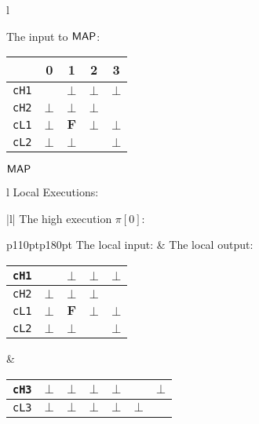 \documentclass[10pt,a4paper,oneside]{article}
\def\VFALSE{\ensuremath{\textbf{F}}}
\def\NIL{\ensuremath{\bot}}
\def\sanserif#1{\ensuremath{\sf #1}}
\def\MAP{\ensuremath{\sanserif{MAP}}}
\def\Prog{\ensuremath{\pi}}
\def\Progl#1{\ensuremath{\Prog[#1]}}
\def\linecode#1{{\texttt{#1}}}
\begin{document}
\begin{figure}[!t]


\begin{lrbox}{\mylistingbox}\begin{tabular}{l}
\hspace{3pt}
\begin{minipage}{183pt}
The input to \MAP:\\
\begin{tabular}{|c|c|c|c|c|}
	\hline
	\backslashbox{Channel}{Time} & 0 & 1 & 2 & 3  \\
    \hline
	\linecode{cH1} &  & \NIL & \NIL & \NIL\\
	\hline
	\linecode{cH2} & \NIL & \NIL & \NIL &  \\
	\hline
	\linecode{cL1} & \NIL & \VFALSE & \NIL & \NIL\\
	\hline
	\linecode{cL2} & \NIL & \NIL &  & \NIL\\
	\hline 
\end{tabular}  
\end{minipage}  \MAP \\

\begin{tabular}{l}
Local Executions: \\
\begin{tabular}{|l|}
\hline
The high execution \Progl{0}:\\
\begin{tabular}{p{110pt}p{180pt}}
The local input: & The local output:\\
\begin{tabular}{|c|c|c|c|c|}
	\hline
	\linecode{cH1} &  & \NIL & \NIL & \NIL\\
	\hline
	\linecode{cH2} & \NIL & \NIL & \NIL & \\
	\hline
	\linecode{cL1} & \NIL & \VFALSE & \NIL & \NIL\\
	\hline
	\linecode{cL2} & \NIL & \NIL &  & \NIL\\
	\hline
\end{tabular} & 
\begin{minipage}{105pt}
\begin{tabular}{|c|c|c|c|c|>{\centering\arraybackslash}p{25pt}|>{\centering\arraybackslash}p{25pt}|}
	\hline	
	\linecode{cH3} & \NIL & \NIL & \NIL & \NIL &  & \NIL\\
	\hline
	\linecode{cL3} & \NIL & \NIL & \NIL & \NIL & \NIL & \\
	\hline 	
\end{tabular}
\vspace{25pt}
\end{minipage} \\


\end{tabular}
\end{tabular}
\end{tabular}
\end{tabular}
\end{lrbox}
\end{figure}
\end{document}
